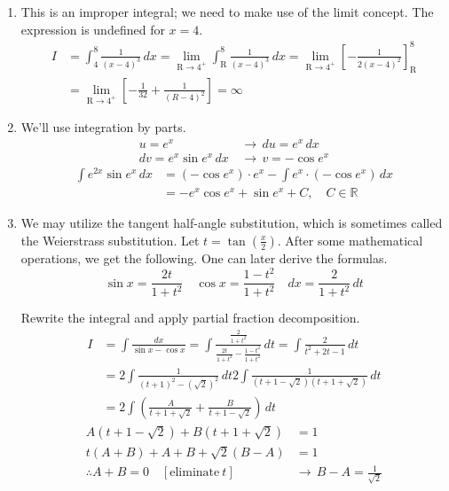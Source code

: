 \documentclass[a4paper, 12pt]{article}
\begin{document}
\begin{enumerate}[leftmargin=*,label=\textbf{\arabic*.}]
\begin{enumerate}[leftmargin=*,label=\textbf{\alph*.}]
\[\boxed{I=\frac{(\tan^2x+1)^3}{6}+C,\quad C\in\mathbb{R}}\]
\item This is an improper integral; we need to make use of the limit concept. The expression is undefined for $x=4$.
\begin{align*}
I &= \int_4^8\frac1{(x-4)^3}\,dx = \lim_{\mathrm{R}\to4^+}\int_\mathrm{R}^8\frac1{(x-4)^3}\,dx=\lim_{\mathrm{R}\to4^+} \left[-\frac1{2(x-4)^2}\right]_\mathrm{R}^8\\[1em]&=\lim_{\mathrm{R}\to4^+} \left[-\frac1{32} + \frac1{(R-4)^2}\right]=\boxed\infty
\end{align*}

\item We'll use integration by parts.
\begin{align*}u=e^x\,&\rightarrow\,du= e^x\,dx \\dv= e^x\sin  e^x \,dx \,&\rightarrow\,v=-\cos e^x\end{align*}
\vspace{-2em}
\begin{align*}\int e^{2x}\sin e^x\,dx&=(-\cos e^x)\cdot e^x-\int e^x\cdot(-\cos e^x)\,dx\\[1em]&=\boxed{- e^x\cos  e^x +\sin  e^x + C, \quad C \in \mathbb{R}} \end{align*}

\item We may utilize the tangent half-angle substitution, which is sometimes called the Weierstrass substitution. Let $\displaystyle t = \tan\left(\frac x2\right)$. After some mathematical operations, we get the following. One can later derive the formulas.
\[\sin x={\frac{2t}{1+t^{2}}}\quad\cos x={\frac{1-t^{2}}{1+t^{2}}}\quad dx={\frac2{1+t^{2}}}\,dt\]

Rewrite the integral and apply partial fraction decomposition.
\begin{align}
I &= \int\frac{dx}{\sin x - \cos x} = \int\frac{\frac2{1+t^2}}{\frac{2t}{1+t^2} -\frac{1-t^2}{1+t^2}}\,dt=\int\frac2{t^2+2t-1}\,dt\nonumber\\[1em]&=2\int\frac1{(t+1)^2-(\sqrt2)^2}\,dt2\int\frac 1{\left(t+1-\sqrt2\right)\left(t+1+\sqrt2\right)}\,dt\nonumber\\[1em]&=2\int\left( \frac A{t+1+\sqrt2} + \frac B{t+1-\sqrt2}\right)\,dt\label{eq:19_20_fall_midterm_4}
\end{align}
\begin{align*}
A(t+1-\sqrt2)+B(t+1+\sqrt2)&=1\\
t(A+B)+A+B+\sqrt2(B-A)&=1\\
\therefore A+B=0\quad[\text{eliminate}\:t]\,&\rightarrow\,B-A=\frac1{\sqrt2}
\end{align*}


\end{enumerate}
\end{enumerate}
\end{document}
